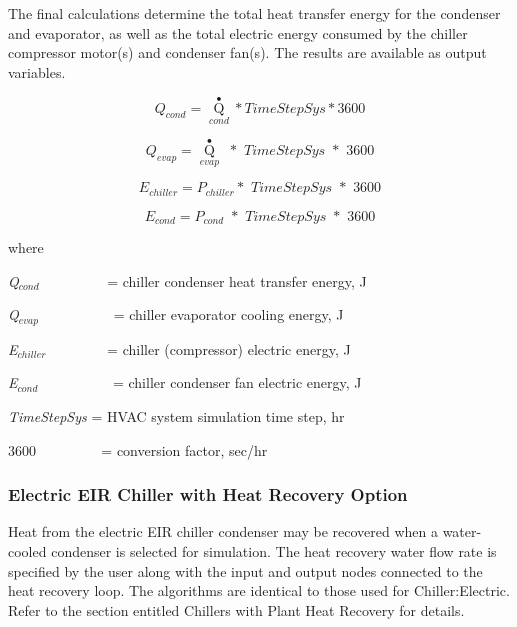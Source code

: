 The final calculations determine the total heat transfer energy for the condenser and evaporator, as well as the total electric energy consumed by the chiller compressor motor(s) and condenser fan(s). The results are available as output variables.

\begin{equation}
{Q_{cond}} = {\mathop Q\limits^ \bullet_{cond}}*TimeStepSys*3600
\end{equation}

\begin{equation}
{Q_{evap}} = {\mathop Q\limits^ \bullet_{evap}}\,\,*\,\,TimeStepSys\,\,*\,\,3600
\end{equation}

\begin{equation}
{E_{chiller}} = {P_{chiller}}*\,\,TimeStepSys\,\,*\,\,3600
\end{equation}

\begin{equation}
{E_{cond}} = {P_{cond}}\,\, * \,\,TimeStepSys\,\,*\,\,3600
\end{equation}

where

\emph{Q\(_{cond}\)}~~~~~~~~~ = chiller condenser heat transfer energy, J

\emph{Q\(_{evap}\)}~~~~~~~~~~ = chiller evaporator cooling energy, J

\emph{E\(_{chiller}\)}~~~~~~~~ = chiller (compressor) electric energy, J

\emph{E\(_{cond}\)}~~~~~~~~~~ = chiller condenser fan electric energy, J

\emph{TimeStepSys} = HVAC system simulation time step, hr

\(3600\) ~~~~~~~~ = conversion factor, sec/hr

\subsubsection{Electric EIR Chiller with Heat Recovery Option}\label{electric-eir-chiller-with-heat-recovery-option}

Heat from the electric EIR chiller condenser may be recovered when a water-cooled condenser is selected for simulation. The heat recovery water flow rate is specified by the user along with the input and output nodes connected to the heat recovery loop. The algorithms are identical to those used for Chiller:Electric. Refer to the section entitled Chillers with Plant Heat Recovery for details.

